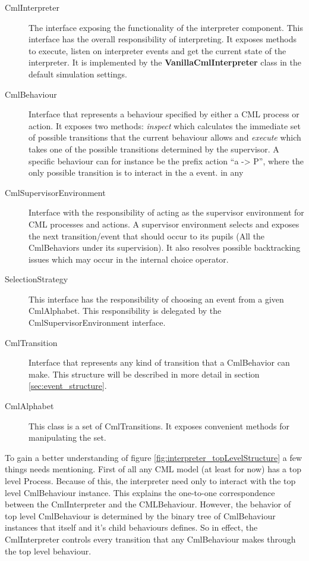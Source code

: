 \documentclass[a4paper, 10pt]{include/compassreport}   %
\begin{document}
\begin{description}
\item[CmlInterpreter] The interface exposing the functionality of the
  interpreter component. This interface has the overall responsibility
  of interpreting. It exposes methods to execute, listen on interpreter
  events and get the current state of the interpreter. It is implemented
  by the \textbf{VanillaCmlInterpreter} class in the default simulation
  settings.
\item[CmlBehaviour] Interface that represents a behaviour specified by
  either a CML process or action. It exposes two methods: \emph{inspect}
  which calculates the immediate set of possible transitions that the
  current behaviour allows and \emph{execute} which takes one of the
  possible transitions determined by the supervisor. A specific
  behaviour can for instance be the prefix action ``a -> P'', where the
  only possible transition is to interact in the a event.  in any
\item [CmlSupervisorEnvironment] Interface with the responsibility of
  acting as the supervisor environment for CML processes and actions. A
  supervisor environment selects and exposes the next transition/event
  that should occur to its pupils (All the CmlBehaviors under its
  supervision). It also resolves possible backtracking issues which
  may occur in the internal choice operator. 
\item[SelectionStrategy] This interface has the responsibility
  of choosing an event from a given CmlAlphabet. This responsibility is
  delegated by the CmlSupervisorEnvironment interface.
\item[CmlTransition] Interface that represents any kind of transition that
  a CmlBehavior can make. This structure will be described in more
  detail in section \ref{sec:event_structure}.
\item[CmlAlphabet] This class is a set of CmlTransitions. It exposes
  convenient methods for manipulating the set.
\end{description}

To gain a better understanding of figure
\ref{fig:interpreter_topLevelStructure} a few things needs
mentioning. First of all any CML model (at least for now) has a top
level Process. Because of this, the interpreter need only to interact
with the top level CmlBehaviour instance. This explains the one-to-one
correspondence between the CmlInterpreter and the
CMLBehaviour. However, the behavior of top level CmlBehaviour is
determined by the binary tree of CmlBehaviour instances that itself
and it's child behaviours defines. So in effect, the CmlInterpreter
controls every transition that any CmlBehaviour makes through the top
level behaviour.
\end{document}
